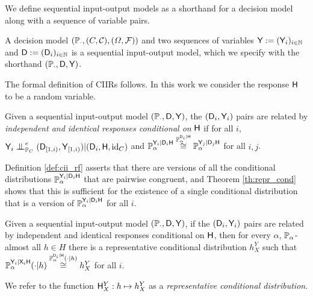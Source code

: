 We define sequential input-output models as a shorthand for a decision model along with a sequence of variable pairs.

\begin{definition}\label{def:seq_io}
A decision model $(\mathbb{P}_{\cdot}, (C,\mathcal{C}), (\Omega,\mathcal{F}))$ and two sequences of variables $\mathsf{Y}:=(\mathsf{Y}_i)_{i\in \mathbb{N}}$ and $\mathsf{D}:=(\mathsf{D}_i)_{i\in\mathbb{N}}$ is a sequential input-output model, which we specify with the shorthand $(\mathbb{P}_\cdot,\mathsf{D},\mathsf{Y})$.
\end{definition}

The formal definition of CIIRs follows. In this work we consider the response $\mathsf{H}$ to be a random variable.

\begin{definition}\label{def:cii_rf}
Given a sequential input-output model $(\mathbb{P}_\cdot,\mathsf{D},\mathsf{Y})$, the $(\mathsf{D}_i,\mathsf{Y}_i)$ pairs are related by \emph{independent and identical responses conditional on} $\mathsf{H}$ if for all $i$, $\RV{Y}_i\CI^e_{\prob{P}_C} (\RV{D}_{[1,i)},\RV{Y}_{[1,i)})|(\RV{D}_i,\RV{H},\text{id}_C)$ and $\mathbb{P}_\alpha^{\mathsf{Y}_i|\mathsf{D}_i\mathsf{H}}\overset{\mathbb{P}_\alpha^{\mathsf{D}_i|\mathsf{H}}}{\cong}\mathbb{P}_\alpha^{\mathsf{Y}_j|\mathsf{D}_j\mathsf{H}}$ for all $i,j$.
\end{definition}

Definition \ref{def:cii_rf} asserts that there are versions of all the conditional distributions $\mathbb{P}_\alpha^{\mathsf{Y}_i|\mathsf{D}_i\mathsf{H}}$ that are pairwise congruent, and Theorem \ref{th:repr_cond} shows that this is sufficient for the existence of a single conditional distribution that is a version of $\mathbb{P}_\alpha^{\mathsf{Y}_i|\mathsf{D}_i\mathsf{H}}$ for all $i$.

\begin{theorem}\label{th:repr_cond}
Given a sequential input-output model $(\mathbb{P}_\cdot,\mathsf{D},\mathsf{Y})$, if the $(\mathsf{D}_i,\mathsf{Y}_i)$ pairs are related by independent and identical responses conditional on $\mathsf{H}$, then for every $\alpha$, $\mathbb{P}_\alpha$-almost all $h\in H$ there is a representative conditional distribution $h^Y_X$ such that $\mathbb{P}_\alpha^{\mathsf{Y}_i|\mathsf{X}_i\mathsf{H}}(\cdot|h)\overset{\mathbb{P}_\alpha^{\mathsf{D}_i|\mathsf{H}}(\cdot|h)}{\cong} h^Y_X$ for all $i$.

We refer to the function $\mathsf{H}^Y_X:h\mapsto h^Y_X$ as a \emph{representative conditional distribution}.
\end{theorem}

